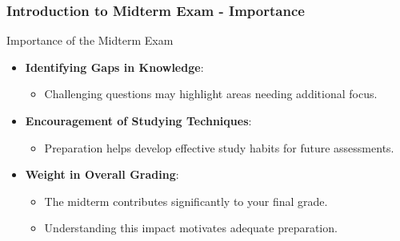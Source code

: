 \documentclass{beamer}
\begin{document}
\begin{frame}[fragile]
    \frametitle{Introduction to Midterm Exam - Importance}
    \begin{block}{Importance of the Midterm Exam}
        \begin{itemize}
            \item \textbf{Identifying Gaps in Knowledge}:
            \begin{itemize}
                \item Challenging questions may highlight areas needing additional focus.
            \end{itemize}
            \item \textbf{Encouragement of Studying Techniques}:
            \begin{itemize}
                \item Preparation helps develop effective study habits for future assessments.
            \end{itemize}
            \item \textbf{Weight in Overall Grading}:
            \begin{itemize}
                \item The midterm contributes significantly to your final grade.
                \item Understanding this impact motivates adequate preparation.
            \end{itemize}
        \end{itemize}
    \end{block}
\end{frame}
\end{document}
